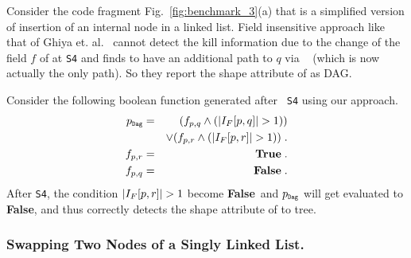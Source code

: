 \documentclass[runningheads,a4paper]{llncs}
\newcommand{\q}{\ensuremath{q}}
\newcommand{\subD}{\mbox{\scalebox{.6}{\Dag}}}
\newcommand{\num}[1]{\ensuremath{|#1|}}
\newcommand{\Dag}{{\tt Dag}}
\newcommand{\false}{\textbf{False}}
\newcommand{\true}{\textbf{True}}
\begin{document}
Consider the code fragment Fig.~\ref{fig:benchmark_3}(a) that
is a simplified version of insertion of an internal node in a
linked list.  Field insensitive approach like that of Ghiya
et. al.~\cite{Ghiya96} cannot detect the kill information due
to the change of the field $f$ of {\tt \on} at {\tt S4} and
finds {\tt \on} to have an additional path to $\q$ via {\tt
  \nn} (which is now actually the only path). So they report
the shape attribute of {\tt \on} as DAG.

Consider the following boolean function generated after {\tt
  S4} using our approach.
\begin{eqnarray*}
  \on_{\subD} &=&   (f_{\on,\q} \wedge (\num{I_F[\on,\q]} > 1)) \\
  && \vee  (f_{\on,\nn} \wedge (\num{I_F[\on,\nn]} > 1)) \; . \\
  f_{\on,\nn} &=& \true \; .\\
  f_{\on,\q} &=& \false \; .\\
\end{eqnarray*}
After {\tt S4}, the condition $\num{I_F[\on,\nn]} > 1$ become
\false\ and $\on_{\subD}$ will get evaluated to \false, and
thus correctly detects the shape attribute of {\tt \on} to
tree.

\subsubsection{Swapping Two Nodes of a Singly Linked List.}
\end{document}

